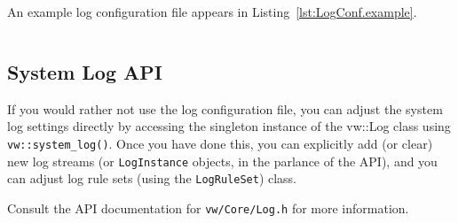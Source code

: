 An example log configuration file appears in
Listing~\ref{lst:LogConf.example}.


\begin{verbatim}
\end{verbatim}

\subsection{System Log API}
If you would rather not use the log configuration file, you can adjust
the system log settings directly by accessing the singleton instance of
the vw::Log class using \verb#vw::system_log()#.  Once you have done
this, you can explicitly add (or clear) new log streams (or
\verb#LogInstance# objects, in the parlance of the API), and you can
adjust log rule sets (using the \verb#LogRuleSet#) class.

Consult the API documentation for \verb#vw/Core/Log.h# for more
information.

